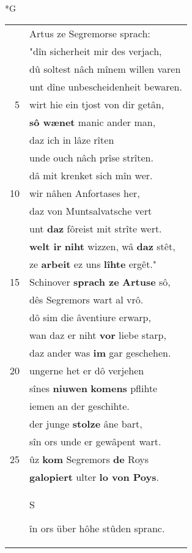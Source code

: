 \documentclass[8pt,a4paper,notitlepage]{article}
\begin{document}
\begin{table}[ht]
\begin{minipage}[t]{0.5\linewidth}
\end{minipage}
\end{table}
\newpage
\begin{table}[ht]
\begin{minipage}[t]{0.5\linewidth}
\small
\begin{center}*G
\end{center}
\begin{tabular}{rl}
 & Artus ze Segremorse sprach:\\ 
 & "dîn sicherheit mir des verjach,\\ 
 & dû soltest nâch mînem willen varen\\ 
 & unt dîne unbescheidenheit bewaren.\\ 
5 & wirt hie ein tjost von dir getân,\\ 
 & \textbf{sô wænet} manic ander man,\\ 
 & daz ich in lâze rîten\\ 
 & unde ouch nâch prîse strîten.\\ 
 & dâ mit krenket sich mîn wer.\\ 
10 & wir nâhen Anfortases her,\\ 
 & daz von Muntsalvatsche vert\\ 
 & unt \textbf{daz} fôreist mit strîte wert.\\ 
 & \textbf{welt ir} \textbf{niht} wizzen, wâ \textbf{daz} stêt,\\ 
 & ze \textbf{arbeit} ez uns \textbf{lîhte} ergêt."\\ 
15 & Schinover \textbf{sprach ze} \textbf{Artuse} sô,\\ 
 & dês Segremors wart al vrô.\\ 
 & dô sim die âventiure erwarp,\\ 
 & wan daz er niht \textbf{vor} liebe starp,\\ 
 & daz ander was \textbf{im} gar geschehen.\\ 
20 & ungerne het er dô verjehen\\ 
 & sînes \textbf{niuwen} \textbf{komens} pflihte\\ 
 & iemen an der geschihte.\\ 
 & der junge \textbf{stolze} âne bart,\\ 
 & sîn ors unde er gewâpent wart.\\ 
25 & ûz \textbf{kom} Segremors \textbf{de} Roys\\ 
 & \textbf{galopiert} ulter \textbf{lo von Poys}.\\ 
 & \begin{large}S\end{large}în ors über hôhe stûden spranc.\\ 

\end{tabular}
\end{minipage}
\end{table}
\end{document}
